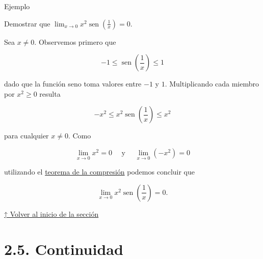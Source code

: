 \documentclass[
  letterpaper,
]{book}
\theoremstyle{plain}
\theoremstyle{remark}
\begin{document}
Ejemplo

Demostrar que
\(\displaystyle \lim_{x\to 0} x^2\operatorname{sen}\left(\frac{1}{x}\right)=0\).

\begin{tcolorbox}[enhanced jigsaw, opacityback=0, left=2mm, opacitybacktitle=0.6, toprule=.15mm, bottomrule=.15mm, colbacktitle=quarto-callout-tip-color!10!white, titlerule=0mm, bottomtitle=1mm, title=\textcolor{quarto-callout-tip-color}{\faLightbulb}\hspace{0.5em}{Solución}, toptitle=1mm, colframe=quarto-callout-tip-color-frame, colback=white, breakable, rightrule=.15mm, arc=.35mm, leftrule=.75mm, coltitle=black]

Sea \(x\neq 0\). Observemos primero que

\[
-1\leq \operatorname{sen}\left(\frac{1}{x}\right)\leq 1
\]

dado que la función seno toma valores entre \(-1\) y \(1\).
Multiplicando cada miembro por \(x^2\geq 0\) resulta

\[
-x^2\leq x^2\operatorname{sen}\left(\frac{1}{x}\right)\leq x^2
\]

para cualquier \(x\neq 0\). Como

\[
\lim_{x\to 0} x^2=0 \quad \text{ y }\quad \lim_{x\to 0} (-x^2)=0
\]

utilizando el \hyperref[teo-compresion]{teorema de la compresión}
podemos concluir que

\[
\lim_{x\to 0} x^2\operatorname{sen}\left(\frac{1}{x}\right)=0.
\]

\end{tcolorbox}

\hyperref[seccion_2.3]{↑ Volver al inicio de la sección}

\section{2.5. Continuidad}\label{seccion_2.5}
\end{document}

